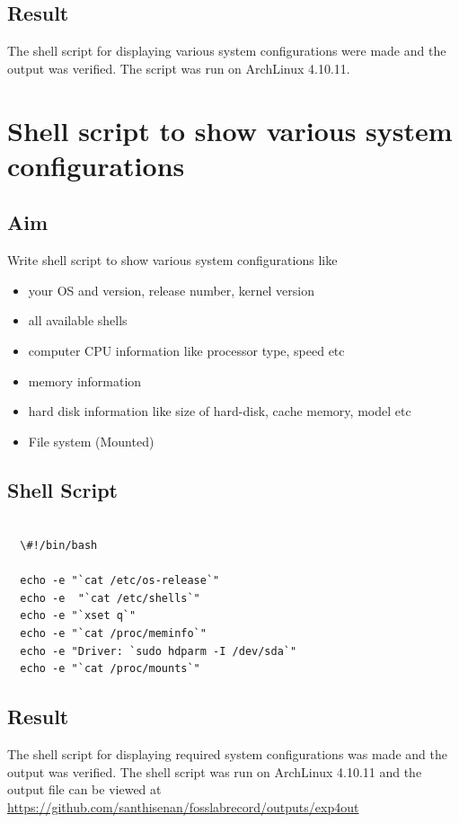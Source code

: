 \documentclass{article}
\begin{document}
\subsection{Result}
The shell script for displaying various system configurations were made and the output was verified. The script was run on ArchLinux 4.10.11.
\begin{refsection}
\cite{shellbible}
\cite{shellbook}
\printbibliography
\end{refsection}

\newpage

\newpage

\section{Shell script to show various system configurations}

\subsection {Aim}

Write shell script to show various system configurations like
\begin{itemize}
\item your OS and version, release number, kernel version
\item all available shells
\item computer CPU information like processor type, speed etc
\item memory information
\item hard disk information like size of hard-disk, cache memory, model etc
\item File system (Mounted)
\end{itemize}

\subsection{Shell Script}

\begin{verbatim}

  \#!/bin/bash
   
  echo -e "`cat /etc/os-release`"
  echo -e  "`cat /etc/shells`"
  echo -e "`xset q`"
  echo -e "`cat /proc/meminfo`"
  echo -e "Driver: `sudo hdparm -I /dev/sda`"
  echo -e "`cat /proc/mounts`"

\end{verbatim}

\subsection{Result}
The shell script for displaying required system configurations was made and the output was verified. The shell script was run on ArchLinux 4.10.11 and the output file can be viewed at \url{https://github.com/santhisenan/fosslabrecord/outputs/exp4out}
\end{document}
